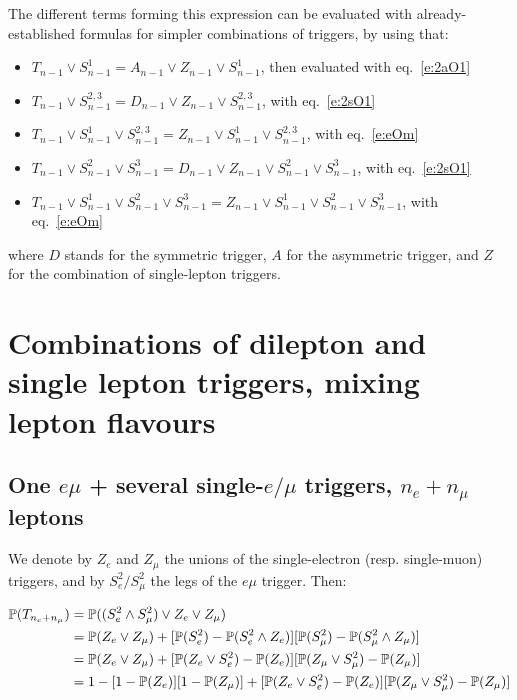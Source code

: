\documentclass{article}
\newcommand{\pro}{\ensuremath{\mathbb{P}}}
\begin{document}
The different terms forming this expression can be evaluated with already-established formulas for simpler combinations of triggers, 
by using that: 
\begin{itemize}
\item $T_{n-1}\vee S_{n-1}^1 = A_{n-1} \vee Z_{n-1} \vee S_{n-1}^1$, then evaluated with eq.~\ref{e:2aO1}
\item $T_{n-1}\vee S_{n-1}^{2,3} = D_{n-1} \vee Z_{n-1} \vee S_{n-1}^{2,3}$, with eq.~\ref{e:2sO1}
\item $T_{n-1}\vee S_{n-1}^1\vee S_{n-1}^{2,3} = Z_{n-1} \vee S_{n-1}^1\vee S_{n-1}^{2,3}$, with eq.~\ref{e:eOm}
\item $T_{n-1}\vee S_{n-1}^2\vee S_{n-1}^3= D_{n-1}\vee Z_{n-1} \vee S_{n-1}^2\vee S_{n-1}^3$, with eq.~\ref{e:2sO1}
\item $T_{n-1}\vee S_{n-1}^1\vee S_{n-1}^2\vee S_{n-1}^3= Z_{n-1} \vee S_{n-1}^1\vee S_{n-1}^2\vee S_{n-1}^3$, with eq.~\ref{e:eOm}
\end{itemize}
where $D$ stands for the symmetric trigger, $A$ for the asymmetric trigger, and $Z$ for the combination of single-lepton triggers. 





\section{Combinations of dilepton and single lepton triggers, mixing lepton flavours}

\subsection{One $e\mu$ + several single-$e/\mu$ triggers, $n_e+n_\mu$ leptons}
\label{s:emO1}

We denote by $Z_e$ and $Z_\mu$ the unions of the single-electron (resp. single-muon) triggers, 
and by $S_e^2/S_\mu^2$ the legs of the $e\mu$ trigger. Then: 

\begin{align}
\pro(T_{n_e+n_\mu}) & = \pro((S_e^2\wedge S_\mu^2)\vee Z_e \vee Z_\mu)\notag\\
&= \pro(Z_e\vee Z_\mu) + [\pro(S_e^2) - \pro(S_e^2\wedge Z_e)][\pro(S_\mu^2) - \pro(S_\mu^2\wedge Z_\mu)]\notag\\
&= \pro(Z_e\vee Z_\mu)+ [\pro(Z_e\vee S_e^2) - \pro(Z_e)][\pro(Z_\mu\vee S_\mu^2) - \pro(Z_\mu) ]\notag\\
&= 1 - [1-\pro(Z_e)][1-\pro(Z_\mu)]+ [\pro(Z_e\vee S_e^2) - \pro(Z_e)][\pro(Z_\mu\vee S_\mu^2) - \pro(Z_\mu) ]
\end{align}
\end{document}
